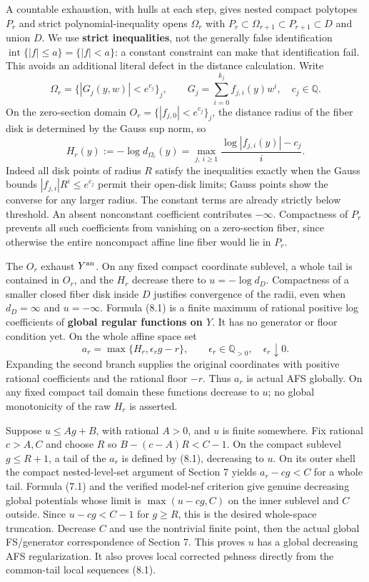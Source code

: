 \documentclass[
  10pt,
]{article}
\begin{document}
A countable exhaustion, with hulls at each step, gives nested compact
polytopes \(P_r\) and strict polynomial-inequality opens \(\Omega_r\)
with \(P_r\subset\Omega_{r+1}\subset P_{r+1}\subset D\) and union \(D\).
We use \textbf{strict inequalities}, not the generally false
identification \(\operatorname{int}\{|f|\le a\}=\{|f|<a\}\): a constant
constraint can make that identification fail. This avoids an additional
literal defect in the distance calculation. Write
\[\Omega_r=\{|G_j(y,w)|<e^{c_j}\}_j,\qquad
 G_j=\sum_{i=0}^{k_j}f_{j,i}(y)w^i,\quad c_j\in\mathbb Q.\] On the
zero-section domain \(O_r=\{|f_{j,0}|<e^{c_j}\}_j\), the distance radius
of the fiber disk is determined by the Gauss sup norm, so
\[H_r(y):=-\log d_{\Omega_r}(y)
     =\max_{j,\ i\ge1}\frac{\log|f_{j,i}(y)|-c_j}{i}.\tag{8.1}\] Indeed
all disk points of radius \(R\) satisfy the inequalities exactly when
the Gauss bounds \(|f_{j,i}|R^i\le e^{c_j}\) permit their open-disk
limits; Gauss points show the converse for any larger radius. The
constant terms are already strictly below threshold. An absent
nonconstant coefficient contributes \(-\infty\). Compactness of \(P_r\)
prevents all such coefficients from vanishing on a zero-section fiber,
since otherwise the entire noncompact affine line fiber would lie in
\(P_r\).

The \(O_r\) exhaust \(Y^{\rm an}\). On any fixed compact coordinate
sublevel, a whole tail is contained in \(O_r\), and the \(H_r\) decrease
there to \(u=-\log d_D\). Compactness of a smaller closed fiber disk
inside \(D\) justifies convergence of the radii, even when
\(d_D=\infty\) and \(u=-\infty\). Formula (8.1) is a finite maximum of
rational positive log coefficients of \textbf{global regular functions
on \(Y\)}. It has no generator or floor condition yet. On the whole
affine space set \[a_r=\max\{H_r,\epsilon_r g-r\},\qquad
       \epsilon_r\in\mathbb Q_{>0},\quad \epsilon_r\downarrow0.\]
Expanding the second branch supplies the original coordinates with
positive rational coefficients and the rational floor \(-r\). Thus
\(a_r\) is actual AFS globally. On any fixed compact tail domain these
functions decrease to \(u\); no global monotonicity of the raw \(H_r\)
is asserted.

Suppose \(u\le Ag+B\), with rational \(A>0\), and \(u\) is finite
somewhere. Fix rational \(c>A,C\) and choose \(R\) so \(B-(c-A)R<C-1\).
On the compact sublevel \(g\le R+1\), a tail of the \(a_r\) is defined
by (8.1), decreasing to \(u\). On its outer shell the compact
nested-level-set argument of Section 7 yields \(a_r-cg<C\) for a whole
tail. Formula (7.1) and the verified model-nef criterion give genuine
decreasing global potentials whose limit is \(\max(u-cg,C)\) on the
inner sublevel and \(C\) outside. Since \(u-cg<C-1\) for \(g\ge R\),
this is the desired whole-space truncation. Decrease \(C\) and use the
nontrivial finite point, then the actual global FS/generator
correspondence of Section 7. This proves \(u\) has a global decreasing
AFS regularization. It also proves local corrected pshness directly from
the common-tail local sequences (8.1).
\end{document}
